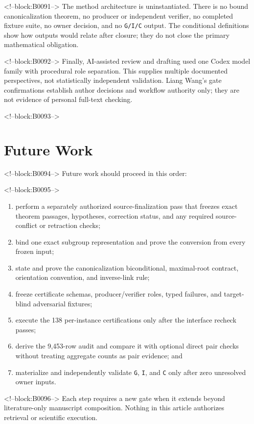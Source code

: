 \documentclass[11pt]{article}
\providecommand{\tightlist}{\setlength{\itemsep}{0pt}\setlength{\parskip}{0pt}}
\begin{document}
<!--block:B0091-->
The method architecture is uninstantiated. There is no bound
canonicalization theorem, no producer or independent verifier, no
completed fixture suite, no owner decision, and no \texttt{G/I/C}
output. The conditional definitions show how outputs would relate after
closure; they do not close the primary mathematical obligation.

<!--block:B0092-->
Finally, AI-assisted review and drafting used one Codex model family
with procedural role separation. This supplies multiple documented
perspectives, not statistically independent validation. Liang Wang's
gate confirmations establish author decisions and workflow authority
only; they are not evidence of personal full-text checking.

<!--block:B0093-->
\hypertarget{9-future-work}{%
\section{Future Work}\label{9-future-work}}

<!--block:B0094-->
Future work should proceed in this order:

<!--block:B0095-->
\begin{enumerate}
\def\labelenumi{\arabic{enumi}.}
\tightlist
\item
  perform a separately authorized source-finalization pass that freezes
  exact theorem passages, hypotheses, correction status, and any
  required source-conflict or retraction checks;
\item
  bind one exact subgroup representation and prove the conversion from
  every frozen input;
\item
  state and prove the canonicalization biconditional, maximal-root
  contract, orientation convention, and inverse-link rule;
\item
  freeze certificate schemas, producer/verifier roles, typed failures,
  and target-blind adversarial fixtures;
\item
  execute the 138 per-instance certifications only after the interface
  recheck passes;
\item
  derive the 9,453-row audit and compare it with optional direct pair
  checks without treating aggregate counts as pair evidence; and
\item
  materialize and independently validate \texttt{G}, \texttt{I}, and
  \texttt{C} only after zero unresolved owner inputs.
\end{enumerate}

<!--block:B0096-->
Each step requires a new gate when it extends beyond literature-only
manuscript composition. Nothing in this article authorizes retrieval or
scientific execution.
\end{document}
